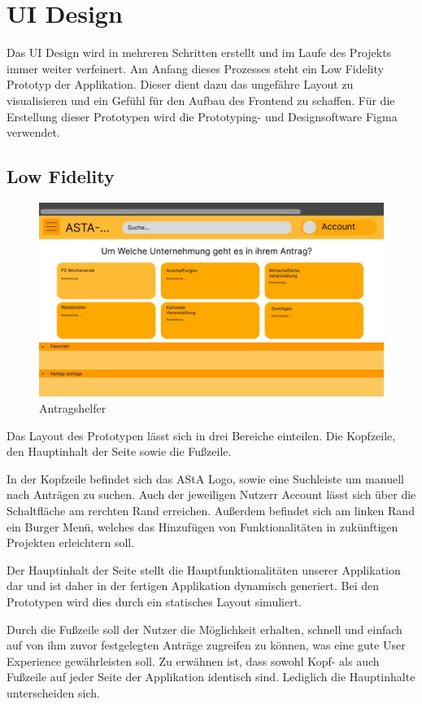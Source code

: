 \chapter{UI Design}\label{ch:ui-design}
Das UI Design wird in mehreren Schritten erstellt und im Laufe des Projekts immer weiter
verfeinert. Am Anfang dieses Prozesses steht ein Low Fidelity Prototyp der Applikation.
Dieser dient dazu das ungefähre Layout zu visualisieren und ein Gefühl für den Aufbau
des Frontend zu schaffen. Für die Erstellung dieser Prototypen wird die Prototyping- und
Designsoftware Figma verwendet.

\section{Low Fidelity}\label{Low Fidelity}
\begin{figure}[h]
  \centering
    \includegraphics[width=1.0\textwidth]{Doc/images/Antragshelfer.png}
    \caption{Antragshelfer}
\end{figure}
Das Layout des Prototypen lässt sich in drei Bereiche einteilen. Die Kopfzeile, den
Hauptinhalt der Seite sowie die Fußzeile.

In der Kopfzeile befindet sich das AStA Logo, sowie eine Suchleiste um manuell nach
Anträgen zu suchen. Auch der jeweiligen Nutzerr Account lässt sich über die Schaltfläche
am rerchten Rand erreichen. Außerdem befindet sich am linken Rand ein Burger Menü,
welches das Hinzufügen von Funktionalitäten in zukünftigen Projekten erleichtern soll.

Der Hauptinhalt der Seite stellt die Hauptfunktionalitäten unserer Applikation dar und
ist daher in der fertigen Applikation dynamisch generiert. Bei den Prototypen wird dies
durch ein statisches Layout simuliert.

Durch die Fußzeile soll der Nutzer die Möglichkeit erhalten, schnell und einfach auf von
ihm zuvor festgelegten Anträge zugreifen zu können, was eine gute User Experience
gewährleisten soll. Zu erwähnen ist, dass sowohl Kopf- als auch Fußzeile auf jeder Seite
der Applikation identisch sind. Lediglich die Hauptinhalte unterscheiden sich.

